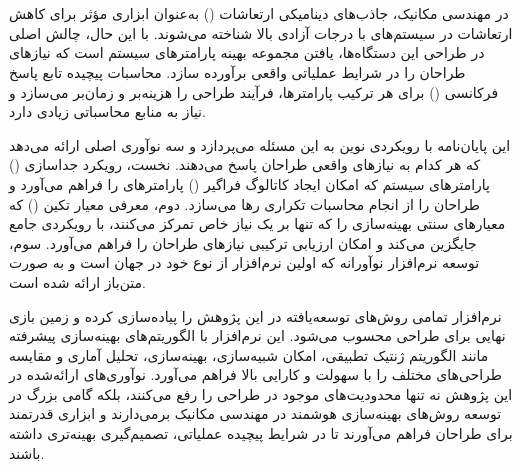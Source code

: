 \chapter*{\AbstractHeadTitle}\thispagestyle{empty}

در مهندسی مکانیک، جاذب‌های دینامیکی ارتعاشات () به‌عنوان ابزاری مؤثر برای کاهش ارتعاشات در سیستم‌های با درجات آزادی بالا شناخته می‌شوند. با این حال، چالش اصلی در طراحی این دستگاه‌ها، یافتن مجموعه بهینه پارامترهای سیستم است که نیازهای طراحان را در شرایط عملیاتی واقعی برآورده سازد. محاسبات پیچیده تابع پاسخ فرکانسی () برای هر ترکیب پارامترها، فرآیند طراحی را هزینه‌بر و زمان‌بر می‌سازد و نیاز به منابع محاسباتی زیادی دارد.

این پایان‌نامه با رویکردی نوین به این مسئله می‌پردازد و سه نوآوری اصلی ارائه می‌دهد که هر کدام به نیازهای واقعی طراحان پاسخ می‌دهند. نخست، رویکرد جداسازی () پارامترهای سیستم که امکان ایجاد کاتالوگ فراگیر () پارامترهای  را فراهم می‌آورد و طراحان را از انجام محاسبات تکراری رها می‌سازد. دوم، معرفی معیار تکین () که معیارهای سنتی بهینه‌سازی را که تنها بر یک نیاز خاص تمرکز می‌کنند، با رویکردی جامع جایگزین می‌کند و امکان ارزیابی ترکیبی نیازهای طراحان را فراهم می‌آورد. سوم، توسعه نرم‌افزار نوآورانه  که اولین نرم‌افزار از نوع خود در جهان است و به صورت متن‌باز ارائه شده است.

نرم‌افزار  تمامی روش‌های توسعه‌یافته در این پژوهش را پیاده‌سازی کرده و زمین بازی نهایی برای طراحی  محسوب می‌شود. این نرم‌افزار با الگوریتم‌های بهینه‌سازی پیشرفته مانند الگوریتم ژنتیک تطبیقی، امکان شبیه‌سازی، بهینه‌سازی، تحلیل آماری و مقایسه طراحی‌های مختلف را با سهولت و کارایی بالا فراهم می‌آورد. نوآوری‌های ارائه‌شده در این پژوهش نه تنها محدودیت‌های موجود در طراحی  را رفع می‌کنند، بلکه گامی بزرگ در توسعه روش‌های بهینه‌سازی هوشمند در مهندسی مکانیک برمی‌دارند و ابزاری قدرتمند برای طراحان فراهم می‌آورند تا در شرایط پیچیده عملیاتی، تصمیم‌گیری بهینه‌تری داشته باشند.

